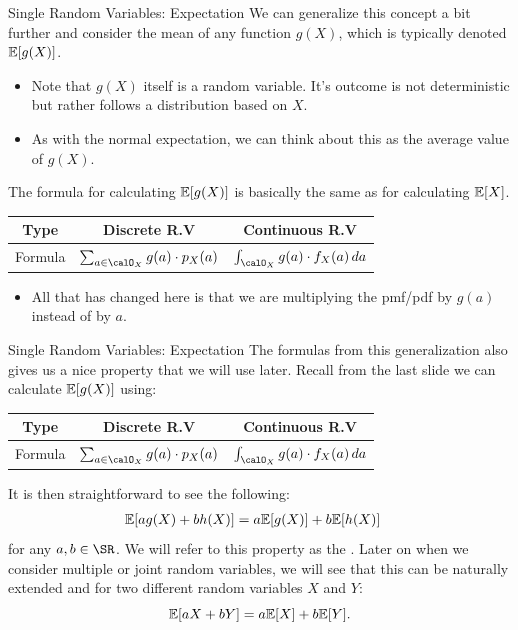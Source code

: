 \documentclass[notheorems,9pt, handout]{beamer}
\begin{document}
\begin{frame}{Single Random Variables: Expectation} 
	\label{frame:srv-mean2}
	\onslide<+->
	We can generalize this concept a bit further and consider the mean of any function \(g(X)\), which is typically denoted \(\mathbb{E}[g(X)]\).
	\begin{itemize}
		\item Note that \(g(X)\) itself is a random variable. It's outcome is not deterministic but rather follows a distribution based on \(X\).
		\item As with the normal expectation, we can think about this as the average value of \(g(X)\). 
	\end{itemize}
	\onslide<+->
	The formula for calculating \(\mathbb{E}[g(X)]\) is basically the same as for calculating \(\mathbb{E}[X]\).
	{\large 
		\begin{table}[htpb]
		\renewcommand{\arraystretch}{1.5}
		\centering
		\begin{tabular}{c|cc}
			Type  & Discrete R.V & Continuous R.V \\
			\hline
			Formula & \(\sum_{a\in\calO_X} g(a)\cdot p_X(a)\) & \( \int_{\calO_X} g(a)\cdot  f_X(a)\,da\)
		\end{tabular}
		\end{table}}
	\onslide<+->
	\vspace{2mm}
	\begin{itemize}
		\item All that has changed here is that we are multiplying the pmf/pdf by \(g(a)\) instead of by \(a\).
	\end{itemize}
\end{frame}
\begin{frame}{Single Random Variables: Expectation} 
	\label{frame:srv-mean-properties}
	The formulas from this generalization also gives us a nice property that we will use later. Recall from the last slide we can calculate \(\mathbb{E}[g(X)]\) using:
	{\large 
		\begin{table}[htpb]
		\renewcommand{\arraystretch}{1.5}
		\centering
		\begin{tabular}{c|cc}
			Type  & Discrete R.V & Continuous R.V \\
			\hline
			Formula & \(\sum_{a\in\calO_X} g(a)\cdot p_X(a)\) & \( \int_{\calO_X} g(a)\cdot  f_X(a)\,da\)
		\end{tabular}
		\end{table}}
	\vspace{5mm}

	It is then straightforward to see the following: 
	\begin{align*}
		\mathbb{E}[ag(X)+bh(X)] &= a\mathbb{E}[g(X)] + b\mathbb{E}[h(X)]
	\end{align*}
	for any \(a,b\in\SR\). We will refer to this property as the . Later on when we consider multiple or joint random variables, we will see that this can be naturally extended and for two different random variables \(X\) and \(Y\):
	\[
	    \mathbb{E}[aX+bY] = a\mathbb{E}[X] + b\mathbb{E}[Y]
	.\] 
\end{frame}
\end{document}
